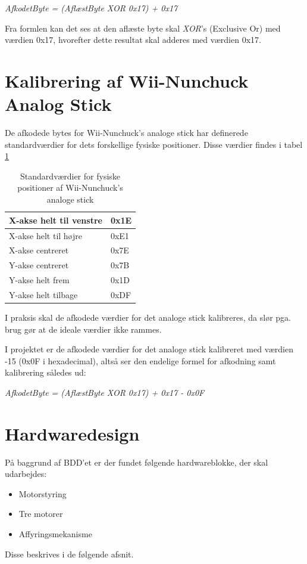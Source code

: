 \textit{AfkodetByte = (AflæstByte XOR 0x17) + 0x17}

Fra formlen kan det ses at den aflæste byte skal \textit{XOR}'s (Exclusive Or) med værdien 0x17, hvorefter dette resultat skal adderes med værdien 0x17.

\section{Kalibrering af Wii-Nunchuck Analog Stick}
De afkodede bytes for Wii-Nunchuck's analoge stick har definerede standardværdier for dets forskellige fysiske positioner. Disse værdier findes i tabel \ref{tabel:WiiNunchuckStickPositioner}

\begin{table}[H]
	\centering
	\begin{tabular}{|l|l|}
		\hline
		X-akse helt til venstre & 0x1E \\ \hline
		X-akse helt til højre   & 0xE1 \\ \hline
		X-akse centreret        & 0x7E \\ \hline
		Y-akse centreret        & 0x7B \\ \hline
		Y-akse helt frem        & 0x1D \\ \hline
		Y-akse helt tilbage     & 0xDF \\ \hline
	\end{tabular}
	\caption{Standardværdier for fysiske positioner af Wii-Nunchuck's analoge stick}
	\label{tabel:WiiNunchuckStickPositioner}
\end{table}

I praksis skal de afkodede værdier for det analoge stick kalibreres, da slør pga. brug gør at de ideale værdier ikke rammes. 

I projektet er de afkodede værdier for det analoge stick kalibreret med værdien -15 (0x0F i hexadecimal), altså ser den endelige formel for afkodning samt kalibrering således ud:

\textit{AfkodetByte = (AflæstByte XOR 0x17) + 0x17 - 0x0F}

\section{Hardwaredesign}
På baggrund af BDD'et er der fundet følgende hardwareblokke, der skal udarbejdes: 
\begin{itemize}
	\item Motorstyring
	\item Tre motorer
	\item Affyringsmekanisme 
\end{itemize}
Disse beskrives i de følgende afsnit. 

